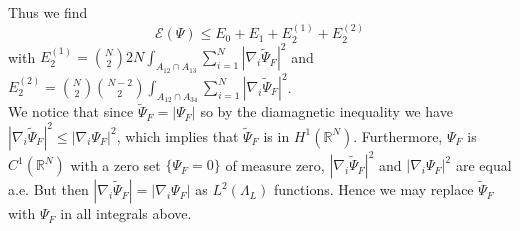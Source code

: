 \documentclass[a4paper,11pt]{article}
\newcommand{\abs}[1]{\left\lvert #1 \right\rvert}
\newcommand{\R}{\mathbb{R}}
\numberwithin{equation}{section}
\begin{document}
	Thus we find \begin{equation}\label{EqBound1}
	\mathcal{E}(\Psi)\leq E_0+E_1+E_2^{(1)}+E_2^{(2)}
	\end{equation}
	with $ E_2^{(1)}=\binom{N}{2}2N\int_{A_{12}\cap A_{13}}\sum_{i=1}^{N}\abs{\nabla_i\tilde{\Psi}_F}^2 $ and $ E_2^{(2)}=\binom{N}{2}\binom{N-2}{2}\int_{A_{12}\cap A_{34}}\sum_{i=1}^{N}\abs{\nabla_i\tilde{\Psi}_F}^2 $.\\
	We notice that since $ \tilde{\Psi}_F=\abs{\Psi_F} $ so by the diamagnetic inequality we have $ \abs{\nabla_i\tilde{\Psi}_F}^2\leq \abs{\nabla_i\Psi_F}^2 $, which implies that $ \tilde{\Psi}_F $ is in $ H^{1}(\R^N) $. Furthermore, $ \Psi_F $ is $ C^{1}(\R^N) $ with a zero set $ \{\Psi_F=0\} $ of measure zero, $ \abs{\nabla_i\tilde{\Psi}_F}^2 $ and $ \abs{\nabla_i\Psi_F}^2 $ are equal a.e. But then $ \abs{\nabla_i\tilde{\Psi}_F}=\abs{\nabla_i\Psi_F} $ as $ L^{2}(\Lambda_L) $ functions. Hence we may replace $ \tilde{\Psi}_F $ with $ \Psi_F $ in all integrals above.
	
\end{document}

